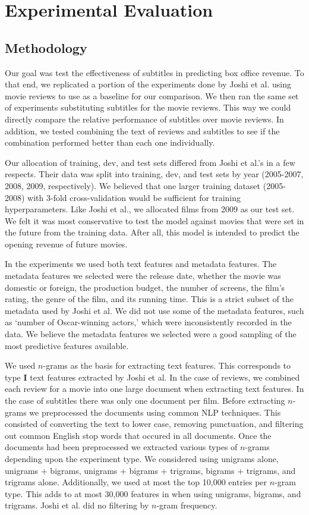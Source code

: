 \documentclass[11pt]{article}
\begin{document}
\section{Experimental Evaluation}
\subsection{Methodology}
Our goal was test the effectiveness of subtitles in predicting box office revenue.
To that end, we replicated a portion of the experiments done by Joshi et al. using
movie reviews to use as a baseline for our comparison. We then ran the same set of
experiments substituting subtitles for the movie reviews. This way we could directly
compare the relative performance of subtitles over movie reviews. In addition, we
tested combining the text of reviews and subtitles to see if the combination performed
better than each one individually.

Our allocation of training, dev, and test sets differed from Joshi et al.'s in a few
respects. Their data was split into training, dev, and test sets by year
(2005-2007, 2008, 2009, respectively). We believed that one larger training dataset
(2005-2008) with 3-fold cross-validation would be sufficient for training hyperparameters.
Like Joshi et al., we allocated films from 2009 as our test set.
We felt it was most conservative to test the model against movies that were
set in the future from the training data. After all, this model is intended to predict
the opening revenue of future movies. 

In the experiments we used both text features and metadata features. The metadata features
we selected were the release date, whether the movie was domestic or foreign, the production
budget, the number of screens, the film's rating, the genre of the film, and its running
time. This is a strict subset of the metadata used by Joshi et al. We did not use some of the
metadata features, such as `number of Oscar-winning actors,' which were inconsistently recorded
in the data. We believe the metadata features we
selected were a good sampling of the most predictive features available.

We used $n$-grams as the basis for extracting text features. This corresponds to type
\textbf{I} text features extracted by Joshi et al. In the case of reviews, we combined
each review for a movie into one large document when extracting text features. In the
case of subtitles there was only one document per film. Before extracting $n$-grams we
preprocessed the documents using common NLP techniques. This consisted of converting
the text to lower case, removing punctuation, and filtering out common English stop words
 that occured in all documents. Once the documents had been preprocessed we extracted various types of $n$-grams depending upon the experiment type. We considered using unigrams alone,
unigrams + bigrams, unigrams + bigrams + trigrams, bigrams + trigrams, and trigrams alone.
Additionally, we used at most the top 10,000 entries per $n$-gram type. This adds to at most
30,000 features in when using unigrams, bigrams, and trigrams. Joshi et al. did no filtering
by $n$-gram frequency.
\end{document}
